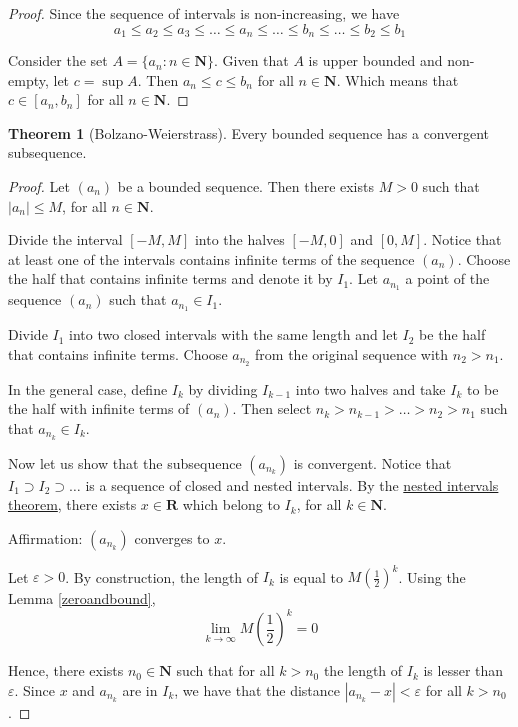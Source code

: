 \documentclass[12pt,a4paper]{article}
\theoremstyle{definition}
\newtheorem{theorem}{Theorem}[section]
\begin{document}
\begin{proof}
	Since the sequence of intervals is non-increasing, we have
	\[
		a_1 \leq a_2 \leq a_3 \leq \ldots \leq a_n \leq \ldots \leq b_n \leq \ldots \leq b_2 \leq b_1
	\]
	
	Consider the set $A = \{ a_n : n \in \textbf{N} \}$. Given that $A$ is upper bounded and non-empty, let $c = \sup A$. Then $a_n \leq c \leq b_n$ for all $n \in \textbf{N}$. Which means that $c \in [a_n, b_n]$ for all $n \in \textbf{N}$.
\end{proof}

\begin{theorem}[Bolzano-Weierstrass]\label{bolz-weier}
	Every bounded sequence has a convergent subsequence.
\end{theorem}

\begin{proof}
	Let $(a_n)$ be a bounded sequence. Then there exists $M > 0$ such that $|a_n| \leq M$, for all $n \in \textbf{N}$.
	
	Divide the interval $[-M,M]$ into the halves $[-M,0]$ and $[0,M]$. Notice that at least one of the intervals contains infinite terms of the sequence $(a_n)$. Choose the half that contains infinite terms and denote it by $I_1$. Let $a_{n_1}$ a point of the sequence $(a_n)$ such that $a_{n_1} \in I_1$.
	
	Divide $I_1$ into two closed intervals with the same length and let $I_2$ be the half that contains infinite terms. Choose $a_{n_2}$ from the original sequence with $n_2 > n_1$.
	
	In the general case, define $I_k$ by dividing $I_{k-1}$ into two halves and take $I_k$ to be the half with infinite terms of $(a_n)$. Then select $n_k > n_{k-1} > \ldots > n_2 > n_1$ such that $a_{n_k}\in I_k$. 
	
	Now let us show that the subsequence $(a_{n_k})$ is convergent. Notice that $I_1 \supset I_2 \supset \ldots$ is a sequence of closed and nested intervals. By the \hyperref[nested-intervals]{nested intervals theorem}, there exists $x \in \textbf{R}$ which belong to $I_k$, for all $k \in \textbf{N}$. 
	
	Affirmation: $(a_{n_k})$ converges to $x$. 
	
	Let $\varepsilon > 0$. By construction, the length of $I_k$ is equal to $M \left( \frac{1}{2} \right)^k$. Using the Lemma \ref{zeroandbound}, 
	\[
		\lim_{k \to \infty} M \left( \frac{1}{2} \right)^k = 0
	\]
	
	Hence, there exists $n_0 \in \textbf{N}$ such that for all $k > n_0$ the length of $I_k$ is lesser than $\varepsilon$. Since $x$ and $a_{n_k}$ are in $I_k$, we have that the distance $|a_{n_k} - x| < \varepsilon$ for all $k > n_0$.
\end{proof}
\end{document}
